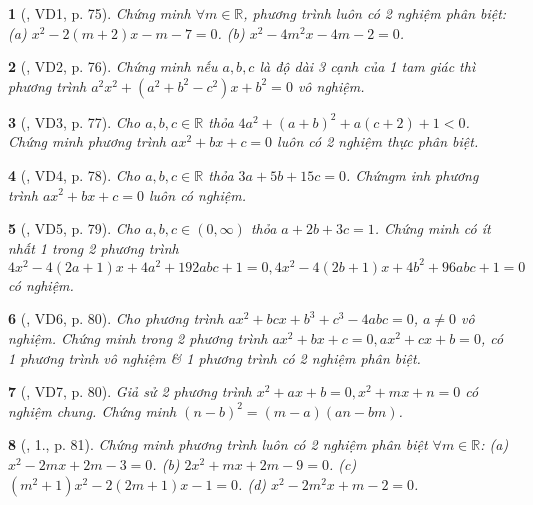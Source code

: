\documentclass{article}
\newtheorem{baitoan}{}
\begin{document}
\begin{baitoan}[\cite{Thu_Viet_Minh_ptb2}, VD1, p. 75]
	Chứng minh $\forall m\in\mathbb{R}$, phương trình luôn có 2 nghiệm phân biệt: (a) $x^2 - 2(m + 2)x - m - 7 = 0$. (b) $x^2 - 4m^2x - 4m - 2 = 0$.
\end{baitoan}

\begin{baitoan}[\cite{Thu_Viet_Minh_ptb2}, VD2, p. 76]
	Chứng minh nếu $a,b,c$ là độ dài 3 cạnh của 1 tam giác thì phương trình $a^2x^2 + (a^2 + b^2 - c^2)x + b^2 = 0$ vô nghiệm.
\end{baitoan}

\begin{baitoan}[\cite{Thu_Viet_Minh_ptb2}, VD3, p. 77]
	Cho $a,b,c\in\mathbb{R}$ thỏa $4a^2 + (a + b)^2 + a(c + 2) + 1 < 0$. Chứng minh phương trình $ax^2 + bx + c = 0$ luôn có 2 nghiệm thực phân biệt.
\end{baitoan}

\begin{baitoan}[\cite{Thu_Viet_Minh_ptb2}, VD4, p. 78]
	Cho $a,b,c\in\mathbb{R}$ thỏa $3a + 5b + 15c = 0$. Chứngm inh phương trình $ax^2 + bx + c = 0$ luôn có nghiệm.
\end{baitoan}

\begin{baitoan}[\cite{Thu_Viet_Minh_ptb2}, VD5, p. 79]
	Cho $a,b,c\in(0,\infty)$ thỏa $a + 2b + 3c = 1$. Chứng minh có ít nhất 1 trong 2 phương trình $4x^2 - 4(2a + 1)x + 4a^2 + 192abc + 1 = 0,4x^2 - 4(2b + 1)x + 4b^2 + 96abc + 1 = 0$ có nghiệm.
\end{baitoan}

\begin{baitoan}[\cite{Thu_Viet_Minh_ptb2}, VD6, p. 80]
	Cho phương trình $ax^2 + bcx + b^3 + c^3 - 4abc = 0$, $a\ne0$ vô nghiệm. Chứng minh trong 2 phương trình $ax^2 + bx + c = 0,ax^2 + cx + b = 0$, có 1 phương trình vô nghiệm \& 1 phương trình có 2 nghiệm phân biệt.
\end{baitoan}

\begin{baitoan}[\cite{Thu_Viet_Minh_ptb2}, VD7, p. 80]
	Giả sử 2 phương trình $x^2 + ax + b = 0,x^2 + mx + n = 0$ có nghiệm chung. Chứng minh $(n - b)^2 = (m - a)(an - bm)$.
\end{baitoan}

\begin{baitoan}[\cite{Thu_Viet_Minh_ptb2}, 1., p. 81]
	Chứng minh phương trình luôn có 2 nghiệm phân biệt $\forall m\in\mathbb{R}$: (a) $x^2 - 2mx + 2m - 3 = 0$. (b) $2x^2 + mx + 2m - 9 = 0$. (c) $(m^2 + 1)x^2 - 2(2m + 1)x - 1 = 0$. (d) $x^2 - 2m^2x + m - 2 = 0$.
\end{baitoan}
\end{document}
